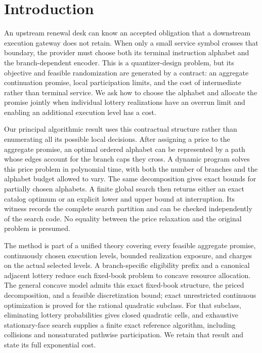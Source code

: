 \section{Introduction}
An upstream renewal desk can know an accepted obligation that a downstream execution gateway does not retain. When only a small service symbol crosses that boundary, the provider must choose both its terminal instruction alphabet and the branch-dependent encoder. This is a quantizer-design problem, but its objective and feasible randomization are generated by a contract: an aggregate continuation promise, local participation limits, and the cost of intermediate rather than terminal service. We ask how to choose the alphabet and allocate the promise jointly when individual lottery realizations have an overrun limit and enabling an additional execution level has a cost.

Our principal algorithmic result uses this contractual structure rather than enumerating all its possible local decisions. After assigning a price to the aggregate promise, an optimal ordered alphabet can be represented by a path whose edges account for the branch caps they cross. A dynamic program solves this price problem in polynomial time, with both the number of branches and the alphabet budget allowed to vary. The same decomposition gives exact bounds for partially chosen alphabets. A finite global search then returns either an exact catalog optimum or an explicit lower and upper bound at interruption. Its witness records the complete search partition and can be checked independently of the search code. No equality between the price relaxation and the original problem is presumed.

The method is part of a unified theory covering every feasible aggregate promise, continuously chosen execution levels, bounded realization exposure, and charges on the actual selected levels. A branch-specific eligibility prefix and a canonical adjacent lottery reduce each fixed-book problem to concave resource allocation. The general concave model admits this exact fixed-book structure, the priced decomposition, and a feasible discretization bound; exact unrestricted continuous optimization is proved for the rational quadratic subclass. For that subclass, eliminating lottery probabilities gives closed quadratic cells, and exhaustive stationary-face search supplies a finite exact reference algorithm, including collisions and nonsaturated pathwise participation. We retain that result and state its full exponential cost.

